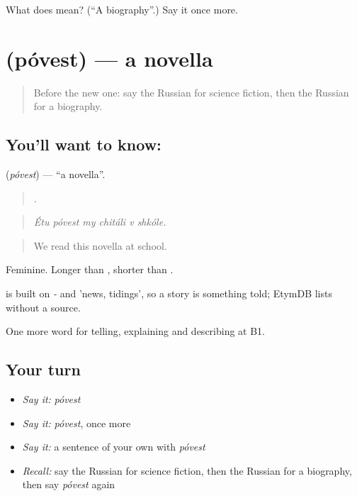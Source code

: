\begin{tcolorbox}[breakable,colback=teal!4,colframe=teal!35!black,title={Before you move on}]
What does  mean? (\textquotedblleft{}A biography\textquotedblright{}.) Say it once more.
\end{tcolorbox}
\section[\texorpdfstring{\ru{повесть} (póvest)}{повесть (póvest)}]{ (póvest) — a novella}

\label{lesson:RU-C524-povest}



\begin{quote}
Before the new one: say the Russian for science fiction, then the Russian for a biography.
\end{quote}

\subsection*{You'll want to know: }
\textbf{} (\emph{póvest}) — \textquotedblleft{}a novella\textquotedblright{}.

\begin{quote}
     .
\end{quote}

\begin{quote}
\emph{Étu póvest my chitáli v shkóle.}
\end{quote}

\begin{quote}
We read this novella at school.
\end{quote}

Feminine. Longer than \emph{}, shorter than \emph{}.

\begin{cousinweb}
\emph{} is built on \emph{-} and \emph{} 'news, tidings', so a story is something told; EtymDB lists \emph{} without a source.
\end{cousinweb}

\begin{grammarlens}[title={What you've built}]
One more word for telling, explaining and describing at B1.
\end{grammarlens}

\subsection*{Your turn}
\begin{itemize}
\raggedright
  \item \emph{Say it:} \emph{póvest}
  \item \emph{Say it:} \emph{póvest}, once more
  \item \emph{Say it:} a sentence of your own with \emph{póvest}
  \item \emph{Recall:} say the Russian for science fiction, then the Russian for a biography, then say \emph{póvest} again
\end{itemize}

